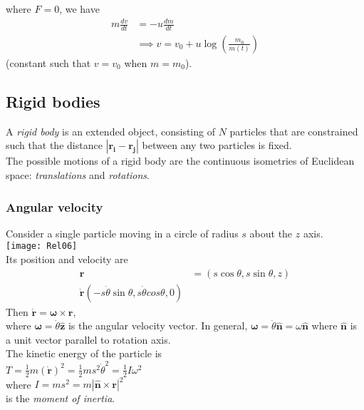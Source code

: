 \documentclass[a4paper]{article}
\begin{document}
\begin{eg}
where $F=0$, we have
\begin{equation*}
\begin{aligned}
m\frac{dv}{dt} &= -u\frac{dm}{dt}\\
& \implies v=v_{0} + u\log \left(\frac{m_{0}}{m\left(t\right)}\right)
\end{aligned}
\end{equation*}
(constant such that $v=v_{0}$ when $m=m_{0}$).\\

\end{eg}

\subsection{Rigid bodies}
A \emph{rigid body} is an extended object, consisting of $N$ particles that are constrained such that the distance $|\mathbf{r_i}-\mathbf{r_j}|$ between any two particles is fixed.\\
The possible motions of a rigid body are the continuous isometries of Euclidean space: \emph{translations} and \emph{rotations}.\\

\subsubsection{Angular velocity}
Consider a single particle moving in a circle of radius $s$ about the $z$ axis.\\
\texttt{[image: Rel06]}\\
Its position and velocity are\\
\begin{equation*}
\begin{aligned}
\mathbf{r}&=\left(s\cos \theta,s\sin\theta,z\right)\\
\mathbf{\dot{r}}\left(-s\dot{\theta}\sin\theta,s\dot{\theta}cos\theta,0\right)
\end{aligned}
\end{equation*}
Then $\mathbf{\dot{r}}=\mathbf{\omega}\times\mathbf{r}$,\\
where $\mathbf{\omega}=\dot{\theta}\hat{\mathbf{z}}$ is the angular velocity vector. In general, $\mathbf{\omega}=\dot{\theta}\hat{\mathbf{n}}=\omega \hat{\mathbf{n}}$ where $\hat{\mathbf{n}}$ is a unit vector parallel to rotation axis.\\
The kinetic energy of the particle is\\
$T=\frac{1}{2}m\left(\dot{\mathbf{r}}\right)^2=\frac{1}{2}ms^2\dot{\theta}^2=\frac{1}{2}I\omega ^2$\\
where $I=ms^2=m|\hat{\mathbf{n}}\times\mathbf{r}|^2$\\
is the \emph{moment of inertia}.
\end{document}
